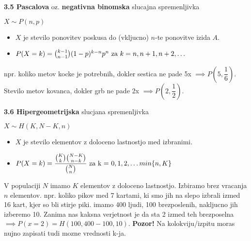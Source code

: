 \documentclass{article}
\begin{document}
\begin{multicols}{3}
\textbf{3.5 Pascalova} oz. \textbf{negativna binomska} slucajna spremenljivka
\begin{center}
    \begin{math}
        X \sim P(n, p)
    \end{math}
\end{center}
\begin{itemize}
    \item $X$ je stevilo ponovitev poskusa do (vkljucno) $n$-te ponovitve izida $A$.
    \item \begin{math}
        P(X = k) = {k - 1 \choose n - 1 }(1 - p)^{k - n} p^{n} $ za $ k = n, n + 1, n + 2, \dots
    \end{math}
\end{itemize}
npr. koliko metov kocke je potrebnih, dokler sestica ne pade 5x $\implies P(5, \dfrac{1}{6})$. Stevilo metov kovanca,
dokler grb ne pade 2x $\implies P(2, \dfrac{1}{2})$.

\textbf{3.6 Hipergeometrijska} slucjana spremenljivka
\begin{center}
    \begin{math}
        X \sim H(K, N - K, n)
    \end{math}
\end{center}
\begin{itemize}
    \item $X$ je stevilo elementov z doloceno lastnostjo med izbranimi.
    \item \begin{math}
        P(X = k) =  \dfrac{ {K \choose k} {N - K \choose n - k} }{{N \choose n}} $ za k = $ 0,1,2,\dots min\{ n, K \}
    \end{math}
\end{itemize}
V populaciji $N$  imamo $K$ elementov  z doloceno lastnostjo. Izbiramo brez vracanja $n$ elementov.
npr. koliko pikov med 7 kartami, ki smo jih na slepo izbrali izmed 16 kart, kjer so bli stirje piki.
imamo 400 ljudi, 100 brezposlenih, nakljucno jih izberemo 10. Zanima nas kaksna verjetnost je da sta 
2 izmed teh brezposelna $\implies P(x=2) = H(100, 400-100, 10)$.
\textbf{Pozor!} Na kolokviju/izpitu moras nujno zapisati tudi mozne vrednosti k-ja.


\end{multicols}
\end{document}
